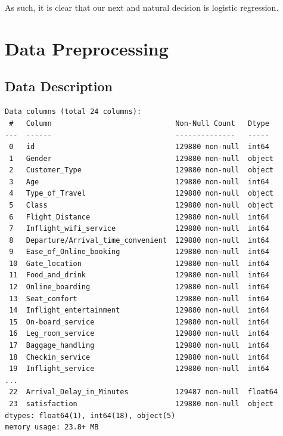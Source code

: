 \documentclass[11pt]{article}
\begin{document}
As such, it is clear that our next and natural decision is logistic regression.

\section{Data Preprocessing}

\subsection{Data Description}
\begin{verbatim}
Data columns (total 24 columns):
 #   Column                             Non-Null Count   Dtype 
---  ------                             --------------   -----  
 0   id                                 129880 non-null  int64  
 1   Gender                             129880 non-null  object 
 2   Customer_Type                      129880 non-null  object 
 3   Age                                129880 non-null  int64  
 4   Type_of_Travel                     129880 non-null  object 
 5   Class                              129880 non-null  object 
 6   Flight_Distance                    129880 non-null  int64  
 7   Inflight_wifi_service              129880 non-null  int64  
 8   Departure/Arrival_time_convenient  129880 non-null  int64  
 9   Ease_of_Online_booking             129880 non-null  int64  
 10  Gate_location                      129880 non-null  int64  
 11  Food_and_drink                     129880 non-null  int64  
 12  Online_boarding                    129880 non-null  int64  
 13  Seat_comfort                       129880 non-null  int64  
 14  Inflight_entertainment             129880 non-null  int64  
 15  On-board_service                   129880 non-null  int64  
 16  Leg_room_service                   129880 non-null  int64  
 17  Baggage_handling                   129880 non-null  int64  
 18  Checkin_service                    129880 non-null  int64  
 19  Inflight_service                   129880 non-null  int64  
...
 22  Arrival_Delay_in_Minutes           129487 non-null  float64
 23  satisfaction                       129880 non-null  object 
dtypes: float64(1), int64(18), object(5)
memory usage: 23.8+ MB
\end{verbatim}
\end{document}
